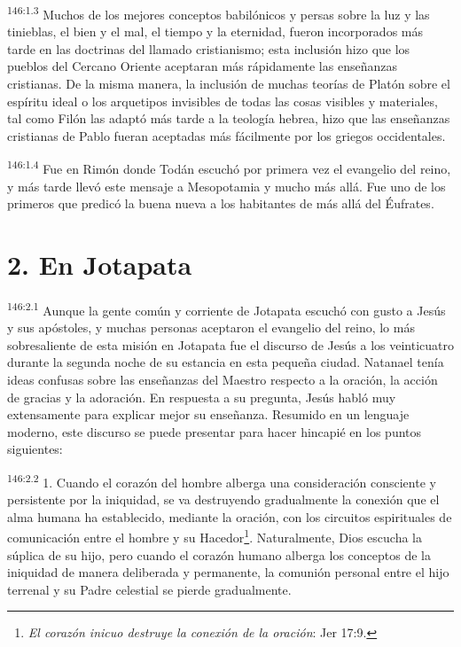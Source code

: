 \par 
\textsuperscript{146:1.3} Muchos de los mejores conceptos babilónicos y persas sobre la luz y las tinieblas, el bien y el mal, el tiempo y la eternidad, fueron incorporados más tarde en las doctrinas del llamado cristianismo; esta inclusión hizo que los pueblos del Cercano Oriente aceptaran más rápidamente las enseñanzas cristianas. De la misma manera, la inclusión de muchas teorías de Platón sobre el espíritu ideal o los arquetipos invisibles de todas las cosas visibles y materiales, tal como Filón las adaptó más tarde a la teología hebrea, hizo que las enseñanzas cristianas de Pablo fueran aceptadas más fácilmente por los griegos occidentales.

\par 
\textsuperscript{146:1.4} Fue en Rimón donde Todán escuchó por primera vez el evangelio del reino, y más tarde llevó este mensaje a Mesopotamia y mucho más allá. Fue uno de los primeros que predicó la buena nueva a los habitantes de más allá del Éufrates.

\section*{2. En Jotapata}
\par 
\textsuperscript{146:2.1} Aunque la gente común y corriente de Jotapata escuchó con gusto a Jesús y sus apóstoles, y muchas personas aceptaron el evangelio del reino, lo más sobresaliente de esta misión en Jotapata fue el discurso de Jesús a los veinticuatro durante la segunda noche de su estancia en esta pequeña ciudad. Natanael tenía ideas confusas sobre las enseñanzas del Maestro respecto a la oración, la acción de gracias y la adoración. En respuesta a su pregunta, Jesús habló muy extensamente para explicar mejor su enseñanza. Resumido en un lenguaje moderno, este discurso se puede presentar para hacer hincapié en los puntos siguientes:

\par 
\textsuperscript{146:2.2} 1. Cuando el corazón del hombre alberga una consideración consciente y persistente por la iniquidad, se va destruyendo gradualmente la conexión que el alma humana ha establecido, mediante la oración, con los circuitos espirituales de comunicación entre el hombre y su Hacedor\footnote{\textit{El corazón inicuo destruye la conexión de la oración}: Jer 17:9.}. Naturalmente, Dios escucha la súplica de su hijo, pero cuando el corazón humano alberga los conceptos de la iniquidad de manera deliberada y permanente, la comunión personal entre el hijo terrenal y su Padre celestial se pierde gradualmente.

